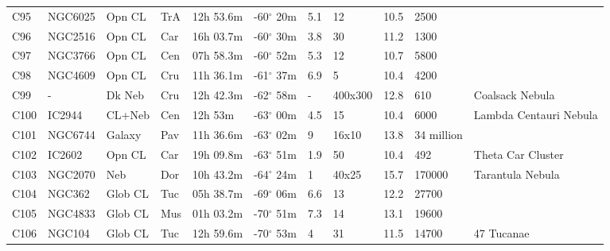 \documentclass[10pt,twoside,a4paper,english]{article}
\begin{document}
\begin{longtable}{@{}lllllllllll@{}}
C95        & NGC6025     & Opn CL     & TrA       & 12h 53.6m & -60$^{\circ}$ 20m  & 5.1       & 12                   & 10.5     & 2500                &                                 \\ 
C96        & NGC2516     & Opn CL     & Car       & 16h 03.7m & -60$^{\circ}$ 30m  & 3.8       & 30                   & 11.2     & 1300                &                                 \\ 
C97        & NGC3766     & Opn CL     & Cen       & 07h 58.3m & -60$^{\circ}$ 52m  & 5.3       & 12                   & 10.7     & 5800                &                                 \\ 
C98        & NGC4609     & Opn CL     & Cru       & 11h 36.1m & -61$^{\circ}$ 37m  & 6.9       & 5                    & 10.4     & 4200                &                                 \\ 
C99        & -           & Dk Neb     & Cru       & 12h 42.3m & -62$^{\circ}$ 58m  & -         & 400x300              & 12.8     & 610                 & Coalsack Nebula                 \\ 
C100       & IC2944      & CL+Neb     & Cen       & 12h 53m   & -63$^{\circ}$ 00m  & 4.5       & 15                   & 10.4     & 6000                & Lambda Centauri Nebula          \\ 
C101       & NGC6744     & Galaxy     & Pav       & 11h 36.6m & -63$^{\circ}$ 02m  & 9         & 16x10                & 13.8     & 34 million          &                                 \\ 
C102       & IC2602      & Opn CL     & Car       & 19h 09.8m & -63$^{\circ}$ 51m  & 1.9       & 50                   & 10.4     & 492                 & Theta Car Cluster               \\ 
C103       & NGC2070     & Neb        & Dor       & 10h 43.2m & -64$^{\circ}$ 24m  & 1         & 40x25                & 15.7     & 170000              & Tarantula Nebula                \\ 
C104       & NGC362      & Glob CL    & Tuc       & 05h 38.7m & -69$^{\circ}$ 06m  & 6.6       & 13                   & 12.2     & 27700               &                                 \\ 
C105       & NGC4833     & Glob CL    & Mus       & 01h 03.2m & -70$^{\circ}$ 51m  & 7.3       & 14                   & 13.1     & 19600               &                                 \\ 
C106       & NGC104      & Glob CL    & Tuc       & 12h 59.6m & -70$^{\circ}$ 53m  & 4         & 31                   & 11.5     & 14700               & 47 Tucanae                      \\ 

\end{longtable}
\end{document}
